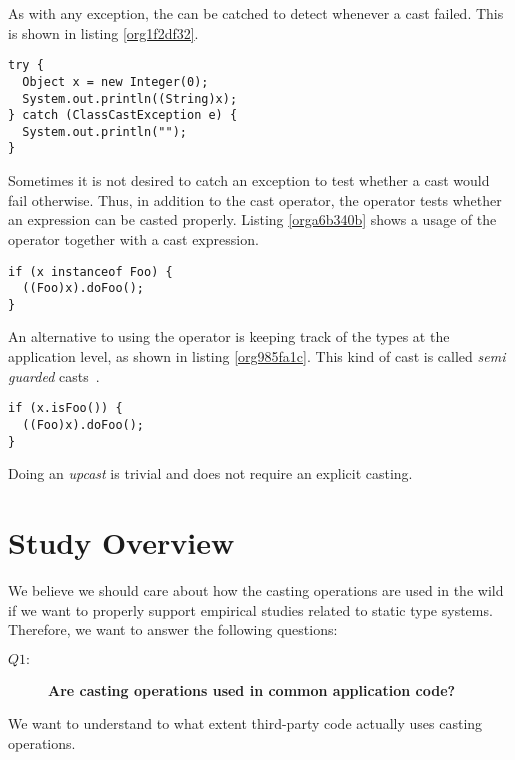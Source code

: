 As with any exception, the \cce{} can be catched to detect whenever a cast failed. 
This is shown in listing \ref{org1f2df32}. 

\begin{lstlisting}
try { 
  Object x = new Integer(0); 
  System.out.println((String)x); 
} catch (ClassCastException e) { 
  System.out.println(""); 
} 
\end{lstlisting}

Sometimes it is not desired to catch an exception to test whether a cast would fail otherwise. 
Thus, in addition to the cast operator, the \instanceof{} operator tests whether an expression can be casted properly. 
Listing \ref{orga6b340b} shows a usage of the \instanceof{} operator together with a cast expression. 

\begin{lstlisting}
if (x instanceof Foo) { 
  ((Foo)x).doFoo(); 
} 
\end{lstlisting}

An alternative to using the \instanceof{} operator is keeping track of the 
types at the application level, as shown in listing \ref{org985fa1c}. 
This kind of cast is called \emph{semi guarded} casts~\cite{winther_guarded_2011}. 

\begin{lstlisting}
if (x.isFoo()) { 
  ((Foo)x).doFoo(); 
} 
\end{lstlisting}

Doing an \emph{upcast} is trivial and does not require an explicit casting. 

\section{Study Overview \label{org8065fcf}}
\label{sec:orga9e9ff5}

We believe we should care about how the casting operations are used in the wild if we want to properly support empirical studies related to static type systems. 
Therefore, we want to answer the following questions: 

\begin{description}
\item[{\(Q1:\)}] \textbf{Are casting operations used in common application code?}
\end{description}
We want to understand to what extent third-party code actually uses casting operations. 

